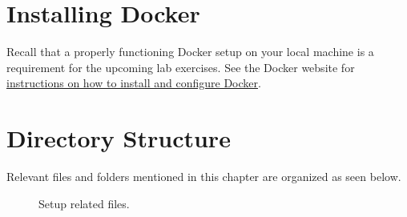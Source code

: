 \section{Installing Docker}

\justify{}
Recall that a properly functioning Docker setup on your local machine is a requirement for the upcoming
lab exercises. See the Docker website for 
\href{https://docs.docker.com/get-docker/}{instructions on how to install and configure Docker}. 



\section{Directory Structure}

\justify{}
Relevant files and folders mentioned in this chapter are organized as seen below.

\begin{figure}[!htb]
	\centering
	
	\caption{Setup related files.}
	\label{setupfiles}
\end{figure}

